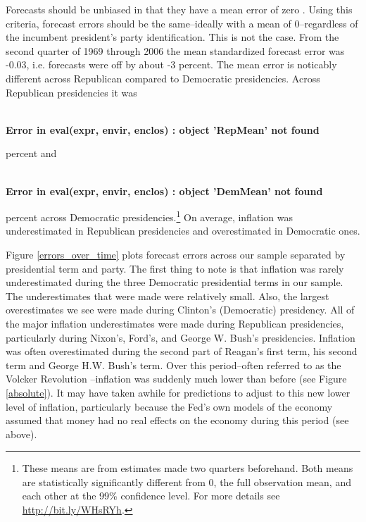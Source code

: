 \documentclass[a4paper]{article}
\begin{document}
Forecasts should be unbiased in that they have a mean error of zero \citep[5]{Bruck2006}. Using this criteria, forecast errors should be the same--ideally with a mean of 0--regardless of the incumbent president's party identification. This is not the case. From the second quarter of 1969 through 2006 the mean standardized forecast error was -0.03, i.e. forecasts were off by about -3 percent. The mean error is noticably different across Republican compared to Democratic presidencies. Across Republican presidencies it was \begin{flushleft}\ttfamily\noindent\bfseries\textcolor{errorcolor}{ \\ 
Error in eval(expr, envir, enclos) : object 'RepMean' not found}\end{flushleft} percent and \begin{flushleft}\ttfamily\noindent\bfseries\textcolor{errorcolor}{ \\ 
Error in eval(expr, envir, enclos) : object 'DemMean' not found}\end{flushleft} percent across Democratic presidencies.\footnote{These means are from estimates made two quarters beforehand. Both means are statistically significantly different from 0, the full observation mean, and each other at the 99\% confidence level. For more details see \url{http://bit.ly/WHsRYh}.} On average, inflation was underestimated in Republican presidencies and overestimated in Democratic ones.

Figure \ref{errors_over_time} plots forecast errors across our sample separated by presidential term and party. The first thing to note is that inflation was rarely underestimated during the three Democratic presidential terms in our sample. The underestimates that were made were relatively small. Also, the largest overestimates we see were made during Clinton's (Democratic) presidency. All of the major inflation underestimates were made during Republican presidencies, particularly during Nixon's, Ford's, and George W. Bush's presidencies. Inflation was often overestimated during the second part of Reagan's first term, his second term and George H.W. Bush's term. Over this period--often referred to as the Volcker Revolution \citep[see][]{Bartels1985}--inflation was suddenly much lower than before (see Figure \ref{absolute}). It may have taken awhile for predictions to adjust to this new lower level of inflation, particularly because the Fed's own models of the economy assumed that money had no real effects on the economy during this period (see above).
\end{document}
